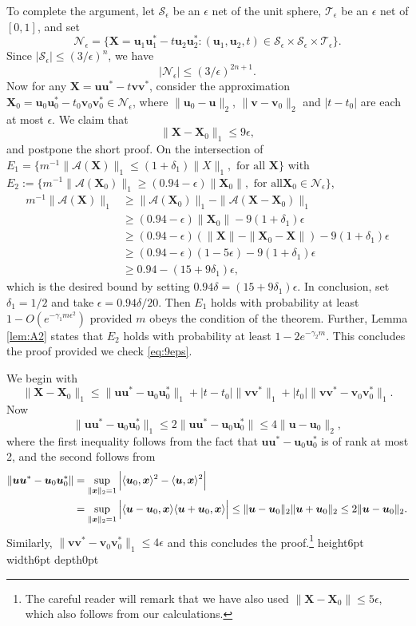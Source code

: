 \documentclass[11pt]{article}
\newcommand{\<}{\langle}
\renewcommand{\>}{\rangle}
\newcommand{\bx}{\bm{x}}
\newcommand{\bX}{\bm{X}}
\newcommand{\bu}{\bm{u}}
\newcommand{\bv}{\bm{v}}
\numberwithin{equation}{section}
\def \endprf{\hfill {\vrule height6pt width6pt depth0pt}\medskip}
\newenvironment{proof}{\noindent {\bf Proof} }{\endprf\par}
\newcommand{\cA}{\mathcal{A}}
\begin{document}
\begin{proof}
To complete the argument, let $\mathcal{S}_{\epsilon}$ be an
$\epsilon$ net of the unit sphere, $\mathcal{T}_{\epsilon}$ be an
$\epsilon$ net of $\left[0,1\right]$, and set $$ \mathcal{N}_\epsilon =
\{\bX = \bu_{1}\bu_{1}^* -t \bu_{2} \bu_{2}^* : (\bu_{1},\bu_{2},t) \in
\mathcal{S}_{\epsilon} \times \mathcal{S}_{\epsilon} \times
\mathcal{T}_{\epsilon} \}.$$ Since $|\mathcal{S}_{\epsilon}| \le
(3/\epsilon)^n$, we have
\[
|\mathcal{N}_\epsilon| \le (3/\epsilon)^{2n+1}. 
\]
Now for any $\bX = \bu \bu ^* - t \bv\bv^*$, consider the approximation $\bX_0 =
\bu_0 \bu_0^* - t_0 \bv_0 \bv_0^* \in \mathcal{N}_\epsilon$, where $\|\bu_0 -
\bu\|_2$, $\|\bv - \bv_0\|_2$ and $|t - t_0|$ are each at most
$\epsilon$. We claim that 
\begin{equation}
  \label{eq:9eps}
  \|\bX-\bX_0\|_1 \le 9 \epsilon,  
\end{equation}
and postpone the short proof. On the intersection of $E_1 = \{m^{-1}
\|\cA(\bX)\|_1 \le (1+\delta_1)\|X\|_1, \text{ for all $\bX$}\}$ with $E_2
:= \{m^{-1}\|\cA(\bX_0)\|_1 \geq (0.94-\epsilon)\|\bX_0\|, \text{ for all
} \bX_0 \in \mathcal{N}_\epsilon \}$,
\begin{align*}
  m^{-1} \|\cA(\bX)\|_1 & \ge \|\cA(\bX_0)\|_1 - \|\cA(\bX-\bX_0)\|_1\\
  &\ge (0.94-\epsilon)\|\bX_0\| - 9(1+\delta_1)\epsilon\\
  & \ge (0.94-\epsilon)(\|\bX\|-\|\bX_0-\bX\|) -9(1+\delta_1)\epsilon\\
  & \ge (0.94-\epsilon)(1-5\epsilon) -9(1+\delta_1)\epsilon\\
  & \ge 0.94 - (15+9\delta_1)\epsilon,
\end{align*}
which is the desired bound by setting $0.94 \delta =
(15+9\delta_1)\epsilon$. In conclusion, set $\delta_1 = 1/2$ and take
$\epsilon = 0.94 \delta/20$. Then $E_1$ holds with probability at
least $1 - O(e^{-\gamma_1 m \epsilon^2})$ provided $m$ obeys the
condition of the theorem. Further, Lemma \ref{lem:A2} states that
$E_2$ holds with probability at least $1 - 2e^{-\gamma_2 m}$. This
concludes the proof provided we check \eqref{eq:9eps}.

We begin with 
\[
\|\bX-\bX_0\|_1 \le \|\bu\bu^* - \bu_0 \bu_0^*\|_1 + |t-t_0| \|\bv\bv^*\|_1 + |t_0|\|
\bv\bv^* - \bv_0\bv_0^*\|_1.
\]
Now 
\[
\|\bu\bu^* - \bu_0\bu_0^*\|_1 \le 2 \|\bu\bu^* - \bu_0\bu_0^*\| \le 4\|\bu-\bu_0\|_2, 
\]
where the first inequality follows from the fact that $\bu\bu^* -
\bu_0\bu_0^*$ is of rank at most 2, and the second follows from 
\begin{align*}
  \|\bu\bu^* - \bu_0\bu_0^*\| & = \sup_{\|\bx\|_2 = 1} \, \Bigl\vert \<\bu_0,\bx\>^2 -
  \<\bu,\bx\>^2\Bigr\vert \\
  & = \sup_{\|\bx\|_2 = 1} \, \Bigl\vert \<\bu - \bu_0,\bx\>
  \<\bu+\bu_0,\bx\>\Bigr\vert \le \|\bu - \bu_0\|_2 \|\bu + \bu_0\|_2 \le 2 \|\bu -
  \bu_0\|_2.
\end{align*}
Similarly, $\|\bv\bv^* - \bv_0\bv_0^*\|_1 \le 4\epsilon$ and this concludes
the proof.\footnote{The careful reader will remark that we have also
  used $\|\bX-\bX_0\| \le 5\epsilon$, which also follows from our
  calculations.}
\end{proof}
\end{document}

